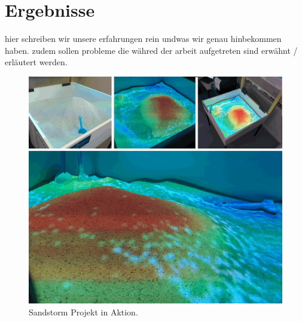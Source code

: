 \chapter{Ergebnisse}
\begin{Spacing}{\mylinespace}

hier schreiben wir unsere erfahrungen rein undwas wir genau hinbekommen haben. zudem sollen probleme die währed der arbeit aufgetreten sind erwähnt / erläutert werden. \\

\begin{figure}[h!]
	\vspace*{30px}
	\includegraphics[width=\columnwidth]{graphics/results.png}	
	\caption{Sandstorm Projekt in Aktion.}
	\label{fig:Results}
\end{figure}

\end{Spacing}
\newpage
\clearpage
